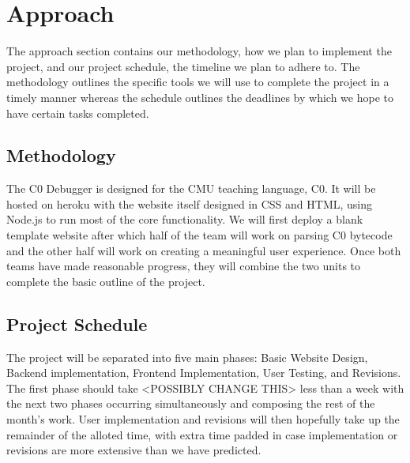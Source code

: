 \documentclass[11pt]{article}
\begin{document}
\section{Approach}
\par
The approach section contains our methodology, how we plan to implement the
project, and our project schedule, the timeline we plan to adhere to.  The
methodology outlines the specific tools we will use to complete the project in
a timely manner whereas the schedule outlines the deadlines by which we hope to
have certain tasks completed.

\subsection{Methodology}
The C0 Debugger is designed for the CMU teaching language, C0.  It will be
hosted on heroku with the website itself designed in CSS and HTML, using
Node.js to run most of the core functionality.  We will first deploy a blank
template website after which half of the team will work on parsing C0 bytecode
and the other half will work on creating a meaningful user experience.  Once
both teams have made reasonable progress, they will combine the two units to
complete the basic outline of the project.

\subsection{Project Schedule}
The project will be separated into five main phases: Basic Website Design,
Backend implementation, Frontend Implementation, User Testing, and Revisions.
The first phase should take <POSSIBLY CHANGE THIS> less than a week with the
next two phases occurring simultaneously and composing the rest of the month's
work.  User implementation and revisions will then hopefully take up the
remainder of the alloted time, with extra time padded in case implementation or
revisions are more extensive than we have predicted.
\end{document}
